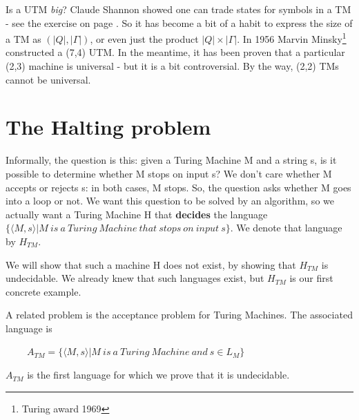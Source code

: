 Is a UTM {\em big}? Claude Shannon showed one can trade states for
symbols in a TM - see the exercise on page \pageref{twosymbols} . So it
has become a bit of a habit to express the size of a TM as
$(|Q|,|\Gamma|)$, or even just the product $|Q| \times |\Gamma|$. In
1956 Marvin Minsky\footnote{Turing award 1969} constructed a (7,4)
UTM. In the meantime, it has been proven that a particular (2,3)
machine is universal - but it is a bit controversial.  By the way, (2,2) TMs
cannot be universal.



\clearpage
\section{The Halting problem}\label{halting}

Informally, the question is this: given a Turing Machine M and a
string s, is it possible to determine whether M stops on input s?
We don't care whether M accepts or rejects s: in both cases, M stops.
So, the question asks whether M goes into a loop or not. We want this
question to be solved by an algorithm, so we actually want a
Turing Machine H that {\bf decides} the language
%
$\{\langle M,s \rangle|
M~is~a~Turing~Machine~that~stops~on~input~s\}$. We denote that
language by $H_{TM}$.


We will show that such a machine H does not exist, by showing that
$H_{TM}$ is undecidable. We already knew that such languages exist, but $H_{TM}$ is our first concrete example.

A related problem is the acceptance problem for Turing Machines. The associated language is

$~~~~~~~~~~A_{TM} = \{\langle M,s \rangle| M~is~a~Turing~Machine~and~s
\in L_{M}\}$

$A_{TM}$ is the first language for which we prove that it is
undecidable.

